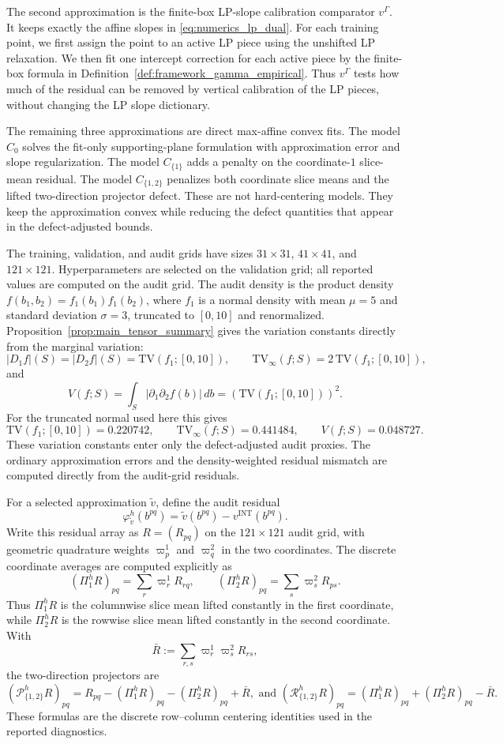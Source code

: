 \documentclass[11pt,letterpaper]{article}
\theoremstyle{definition}
\theoremstyle{remark}
\newcommand{\INT}{\mathrm{INT}}
\newcommand{\TV}{\mathrm{TV}}
\begin{document}
The second approximation is the finite-box LP-slope calibration comparator $v^\Gamma$.
It keeps exactly the affine slopes in \eqref{eq:numerics_lp_dual}. For each
training point, we first assign the point to an active LP piece using the
unshifted LP relaxation. We then fit one intercept correction for each active
piece by the finite-box formula in Definition~\ref{def:framework_gamma_empirical}.
Thus $v^\Gamma$ tests how much of the residual can be removed by vertical
calibration of the LP pieces, without changing the LP slope dictionary.

The remaining three approximations are direct max-affine convex fits. The
model $C_0$ solves the fit-only supporting-plane formulation with approximation
error and slope regularization. The model $C_{\{1\}}$ adds a penalty on the
coordinate-$1$ slice-mean residual. The model $C_{\{1,2\}}$ penalizes both coordinate
slice means and the lifted two-direction projector defect. These are not
hard-centering models. They keep the approximation convex while reducing the
defect quantities that appear in the defect-adjusted bounds.

The training, validation, and audit grids have sizes $31\times31$,
$41\times41$, and $121\times121$. Hyperparameters are selected on the
validation grid; all reported values are computed on the audit grid. The audit
density is the product density $f(b_1,b_2)=f_1(b_1)f_1(b_2)$, where $f_1$ is a
normal density with mean $\mu=5$ and standard deviation $\sigma=3$, truncated
to $[0,10]$ and renormalized. Proposition~\ref{prop:main_tensor_summary} gives
the variation constants directly from the marginal variation:
$$
|D_1f|(S)=|D_2f|(S)=\TV(f_1;[0,10]),
\qquad
\TV_\infty(f;S)=2\,\TV(f_1;[0,10]),
$$
and
$$
V(f;S)
=
\int_S|\partial_1\partial_2 f(b)|\,db
=
\left(\TV(f_1;[0,10])\right)^2.
$$
For the truncated normal used here this gives
$$
\TV(f_1;[0,10])=0.220742,
\qquad
\TV_\infty(f;S)=0.441484,
\qquad
V(f;S)=0.048727.
$$
These variation constants enter only the defect-adjusted audit proxies. The
ordinary approximation errors and the density-weighted residual mismatch are
computed directly from the audit-grid residuals.

For a selected approximation $\widetilde v$, define the audit residual
$$
\varphi_{\widetilde v}^h(b^{pq})
=
\widetilde v(b^{pq})-v^{\INT}(b^{pq}).
$$
Write this residual array as $R=(R_{pq})$ on the $121\times121$ audit grid,
with geometric quadrature weights $\varpi_p^1$ and $\varpi_q^2$ in the two
coordinates. The discrete coordinate averages are computed explicitly as
$$
(\Pi_1^hR)_{pq}
=
\sum_r \varpi_r^1 R_{rq},
\qquad
(\Pi_2^hR)_{pq}
=
\sum_s \varpi_s^2 R_{ps}.
$$
Thus $\Pi_1^hR$ is the columnwise slice mean lifted constantly in the first
coordinate, while $\Pi_2^hR$ is the rowwise slice mean lifted constantly in the
second coordinate. With
$$
\bar R
:=
\sum_{r,s}\varpi_r^1\varpi_s^2R_{rs},
$$
the two-direction projectors are
$$
(\mathcal P_{\{1,2\}}^hR)_{pq}
=
R_{pq}-(\Pi_1^hR)_{pq}-(\Pi_2^hR)_{pq}+\bar R,
\text{ and }
(\mathcal R_{\{1,2\}}^hR)_{pq}
=
(\Pi_1^hR)_{pq}+(\Pi_2^hR)_{pq}-\bar R.
$$
These formulas are the discrete row--column centering identities used in the
reported diagnostics.
\end{document}
